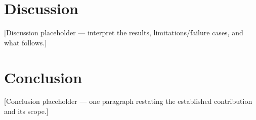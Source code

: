 \section{Discussion}
[Discussion placeholder — interpret the results, limitations/failure cases, and what follows.]

\section{Conclusion}
[Conclusion placeholder — one paragraph restating the established contribution and its scope.]
